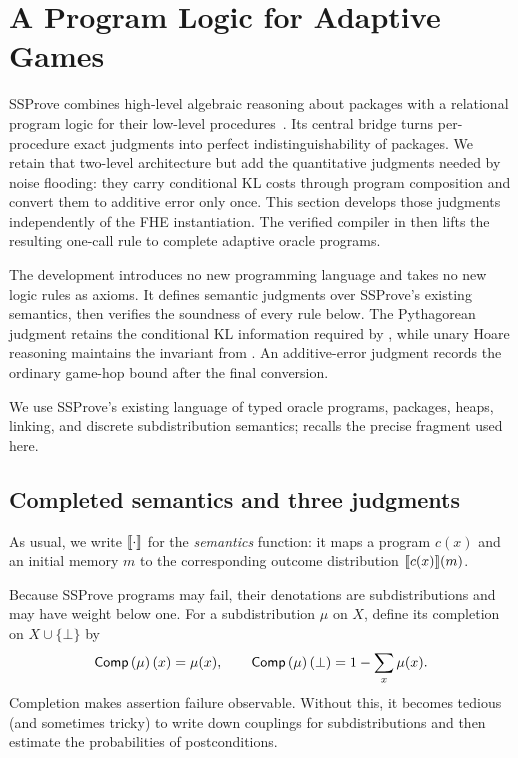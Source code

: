 \section{A Program Logic for Adaptive Games}
\label{sec:pyth-toolkit}

SSProve combines high-level algebraic reasoning about packages with a relational program logic for their low-level procedures~\cite{ssprove}.
Its central bridge turns per-procedure exact judgments into perfect indistinguishability of packages.
We retain that two-level architecture but add the quantitative judgments needed
by noise flooding: they carry conditional KL costs through program composition
and convert them to additive error only once.
This section develops those judgments independently of the FHE instantiation.
The verified compiler in  then lifts the resulting
one-call rule to complete adaptive oracle programs.

The development introduces no new programming language and takes no new logic
rules as axioms.
It defines semantic judgments over SSProve's existing semantics, then verifies the soundness of every rule below.
The Pythagorean judgment retains the conditional KL information required by
, while unary Hoare reasoning maintains the invariant from
.
An additive-error judgment records the ordinary game-hop bound after the final
conversion.

We use SSProve's existing language of typed oracle programs, packages, heaps,
linking, and discrete subdistribution semantics; 
recalls the precise fragment used here.

\subsection{Completed semantics and three judgments}

As usual, we write \(\llbracket \cdot\rrbracket\) for the \emph{semantics} function:
it maps a program \(c(x)\) and an initial memory \(m\) to the corresponding outcome distribution
\(\llbracket c(x)\rrbracket(m)\).

Because SSProve programs may fail, their denotations are subdistributions and
may have weight below one.
For
a subdistribution \(\mu\) on \(X\), define its completion on
\(X\cup\{\bot\}\) by
\[
 \mathsf{Comp}\left(\mu\right)(x)=\mu(x),\qquad
 \mathsf{Comp}\left(\mu\right)(\bot)=1-\sum_x\mu(x).
\]
Completion makes assertion failure observable.
Without this, it becomes tedious (and sometimes tricky) to write down couplings for subdistributions and then estimate the probabilities of postconditions.

